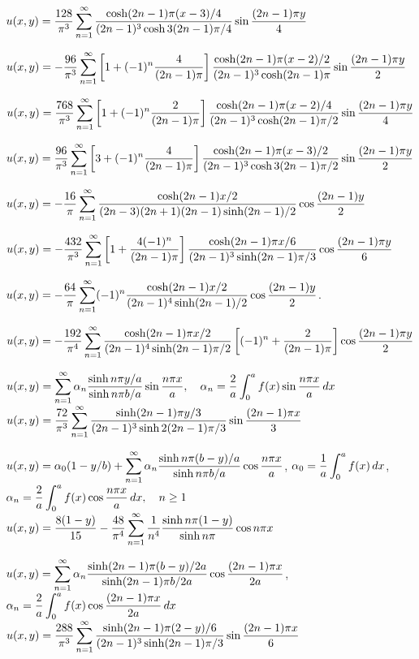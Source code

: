 $u(x,y)=\displaystyle
\frac{128}{\pi^3}\sum_{n=1}^\infty\frac{\cosh(2n-1)\pi(x-3)/4}{(2n-1)^3\cosh3(2n-1)\pi/4}
\sin\frac{(2n-1)\pi y}{4}$

$u(x,y)
=\displaystyle-\frac{96}{\pi^3}\sum_{n=1}^\infty
\left[1+(-1)^n\frac{4}{(2n-1)\pi}\right]
\frac{\cosh(2n-1)\pi(x-2)/2}{(2n-1)^3\cosh(2n-1)\pi}
\sin\frac{(2n-1)\pi y}{2}$


$u(x,y)
=\displaystyle\frac{768}{\pi^3}\sum_{n=1}^\infty
\left[1+(-1)^n\frac{2}{(2n-1)\pi}\right]
\frac{\cosh(2n-1)\pi(x-2)/4}{(2n-1)^3\cosh(2n-1)\pi/2}
\sin\frac{(2n-1)\pi y}{4}$

$u(x,y)
=\displaystyle\frac{96}{\pi^3}\sum_{n=1}^\infty
\left[3+(-1)^n\frac{4}{(2n-1)\pi}\right]
\frac{\cosh(2n-1)\pi(x-3)/2}{(2n-1)^3\cosh3(2n-1)\pi/2}
\sin\frac{(2n-1)\pi y}{2}$

$u(x,y)=
-\displaystyle\frac{16}{\pi}\sum_{n=1}^\infty\frac{\cosh(2n-1)x/2}{(2n-3)(2n+1)(2n-1)\sinh(2n-1)/2}
\cos\frac{(2n-1) y}{2}$

$u(x,y)=-\displaystyle\frac{432}{\pi^3}\sum_{n=1}^\infty
\left[1+\frac{4(-1)^n}{(2n-1)\pi}\right]
\frac{\cosh(2n-1)\pi x/6}{(2n-1)^3\sinh(2n-1)\pi/3}
\cos\frac{(2n-1)\pi
y}{6}$

$u(x,y)=-\displaystyle
\frac{64}{\pi}\sum_{n=1}^\infty(-1)^n\frac{\cosh(2n-1)x/2}{(2n-1)^4\sinh(2n-1)/2}\cos\frac{(2n-1) y}{2}$.

$u(x,y)=-\displaystyle\frac{192}{\pi^4}\sum_{n=1}^\infty
\frac{\cosh(2n-1)\pi x/2}{(2n-1)^4\sinh(2n-1)\pi/2}
\left[(-1)^n+\frac{2}{(2n-1)\pi}\right]
\cos\frac{(2n-1)\pi y}{2}$



$\displaystyle u(x,y)=\sum_{n=1}^\infty\alpha_n\frac{\sinh n\pi y/a}{
\sinh n\pi b/a}\sin
\frac{n\pi x}{a},\quad
\alpha_n=\frac{2}{a}\int_0^a f(x)\sin
\frac{n\pi x}{a}\,dx$
$u(x,y)=\displaystyle\frac{72}{\pi^3}\sum_{n=1}^\infty
\frac{\sinh(2n-1)\pi y/3}{(2n-1)^3\sinh2(2n-1)\pi/3}
\sin\frac{(2n-1)\pi x}{ 3}$


$\displaystyle
u(x,y)=\alpha_0(1-y/b)+\sum_{n=1}^\infty\alpha_n\frac{\sinh n\pi(b-y)/
a}{\sinh n\pi b/a}\cos
\frac{n\pi x}{a}$, \quad
$\displaystyle\alpha_0=\frac{1}{a}\int_0^a f(x)\,dx$,
$\displaystyle\alpha_n=\frac{2}{a}\int_0^a f(x)\cos
\frac{n\pi x}{a}\,dx,\quad n\ge1$
$\displaystyle u(x,y)=\frac{8(1-y)}{15}-\frac{48}{\pi^4}\sum_{n=1}^\infty\frac{1}{n^4}\frac{\sinh n\pi(1-y)}{\sinh n\pi}\cos n\pi x$


$\displaystyle
u(x,y)=\sum_{n=1}^\infty\alpha_n\frac{\sinh(2n-1)\pi(b-y)/2a
}{\sinh(2n-1)\pi b/2a}\cos
\frac{(2n-1)\pi x}{2a}$,
$\displaystyle\alpha_n=\frac{2}{a}\int_0^a
f(x)\cos\frac{(2n-1)\pi x}{2a}\,dx$
$u(x,y)=\displaystyle
\frac{288}{\pi^3}\sum_{n=1}^\infty\frac{\sinh(2n-1)\pi(2-y)/6}{
(2n-1)^3\sinh(2n-1)\pi/3}\sin\frac{(2n-1)\pi x}{6}$

